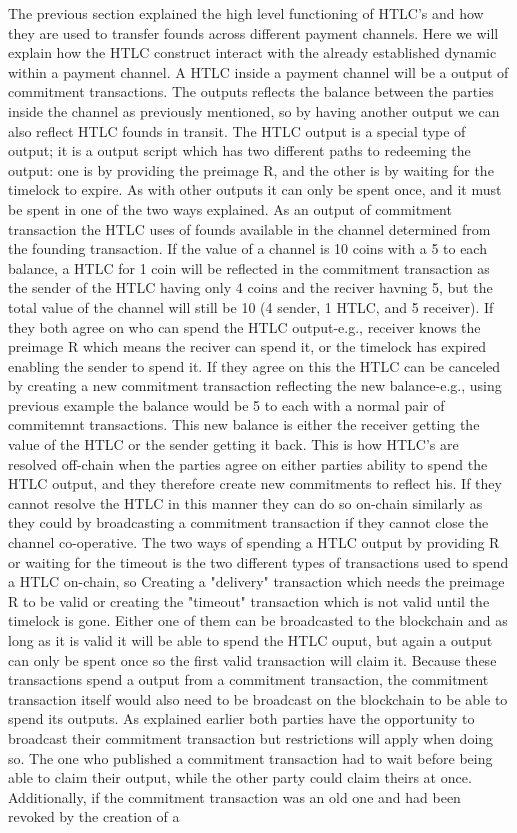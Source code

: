 The previous section explained the high level functioning of HTLC's and how they are used to transfer founds across different payment channels.
Here we will explain how the HTLC construct interact with the already established dynamic within a payment channel.
A HTLC inside a payment channel will be a output of commitment transactions. The outputs reflects the balance between the parties inside the channel as previously mentioned, so by having another output we can also reflect HTLC founds in transit. The HTLC output is a special type of output; it is a output script which has two different paths to redeeming the output: one is by providing the preimage R, and the other is by waiting for the timelock to expire. As with other outputs it can only be spent once, and it must be spent in one of the two ways explained.
As an output of commitment transaction the HTLC uses of founds available in the channel determined from the founding transaction. If the value of a channel is 10 coins with a 5 to each balance, a HTLC for 1 coin will be reflected in the commitment transaction as the sender of the HTLC having only 4 coins and the reciver havning 5, but the total value of the channel will still be 10 (4 sender, 1 HTLC, and 5 receiver). If they both agree on who can spend the HTLC output-e.g., receiver knows the preimage R which means the reciver can spend it, or the timelock has expired enabling the sender to spend it. If they agree on this the HTLC can be canceled by creating a new commitment transaction reflecting the new balance-e.g., using previous example the balance would be 5 to each with a normal pair of commitemnt transactions. This new balance is either the receiver getting the value of the HTLC or the sender getting it back. This is how HTLC's are resolved off-chain when the parties agree on either parties ability to spend the HTLC output, and they therefore create new commitments to reflect his.
If they cannot resolve the HTLC in this manner they can do so on-chain similarly as they could by broadcasting a commitment transaction if they cannot close the channel co-operative. 
The two ways of spending a HTLC output by providing R or waiting for the timeout is the two different types of transactions used to spend a HTLC on-chain, so Creating a "delivery" transaction which needs the preimage R to be valid or creating the "timeout" transaction which is not valid until the timelock is gone. Either one of them can be broadcasted to the blockchain and as long as it is valid it will be able to spend the HTLC ouput, but again a output can only be spent once so the first valid transaction will claim it. Because these transactions spend a output from a commitment transaction, the commitment transaction itself would also need to be broadcast on the blockchain to be able to spend its outputs. As explained earlier both parties have the opportunity to broadcast their commitment transaction but restrictions will apply when doing so. The one who published a commitment transaction had to wait before being able to claim their output, while the other party could claim theirs at once. Additionally, if the commitment transaction was an old one and had been revoked by the creation of a 
